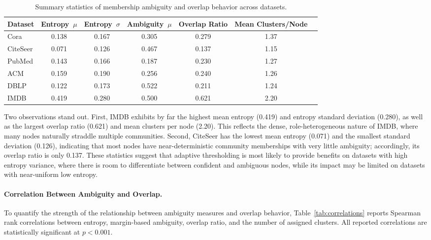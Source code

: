 \documentclass[pdflatex,sn-mathphys-num]{sn-jnl}%
\theoremstyle{thmstyleone}%
\theoremstyle{thmstyletwo}%
\theoremstyle{thmstylethree}%
\begin{document}
\begin{table}[ht]
\centering
\caption{Summary statistics of membership ambiguity and overlap behavior across datasets.}
\label{tab:ambiguity-stats}
\begin{tabular}{lcccccc}
\toprule
\textbf{Dataset} & \textbf{Entropy~$\mu$} & \textbf{Entropy~$\sigma$} & \textbf{Ambiguity~$\mu$} & \textbf{Overlap Ratio} & \textbf{Mean Clusters/Node} \\
\midrule
Cora      & 0.138 & 0.167 & 0.305 & 0.279 & 1.37 \\
CiteSeer  & 0.071 & 0.126 & 0.467 & 0.137 & 1.15 \\
PubMed    & 0.143 & 0.166 & 0.187 & 0.230 & 1.27 \\
ACM       & 0.159 & 0.190 & 0.256 & 0.240 & 1.26 \\
DBLP      & 0.122 & 0.173 & 0.522 & 0.211 & 1.24 \\
IMDB      & 0.419 & 0.280 & 0.500 & 0.621 & 2.20 \\
\bottomrule
\end{tabular}
\end{table}

Two observations stand out. 
First, IMDB exhibits by far the highest mean entropy (0.419) and entropy standard deviation (0.280), as well as the largest overlap ratio (0.621) and mean clusters per node (2.20). 
This reflects the dense, role-heterogeneous nature of IMDB, where many nodes naturally straddle multiple communities. 
Second, CiteSeer has the lowest mean entropy (0.071) and the smallest standard deviation (0.126), indicating that most nodes have near-deterministic community memberships with very little ambiguity; accordingly, its overlap ratio is only 0.137. 
These statistics suggest that adaptive thresholding is most likely to provide benefits on datasets with high entropy variance, where there is room to differentiate between confident and ambiguous nodes, while its impact may be limited on datasets with near-uniform low entropy.

\paragraph{Correlation Between Ambiguity and Overlap.}

To quantify the strength of the relationship between ambiguity measures and overlap behavior, Table~\ref{tab:correlations} reports Spearman rank correlations between entropy, margin-based ambiguity, overlap ratio, and the number of assigned clusters. 
All reported correlations are statistically significant at $p < 0.001$.
\end{document}

